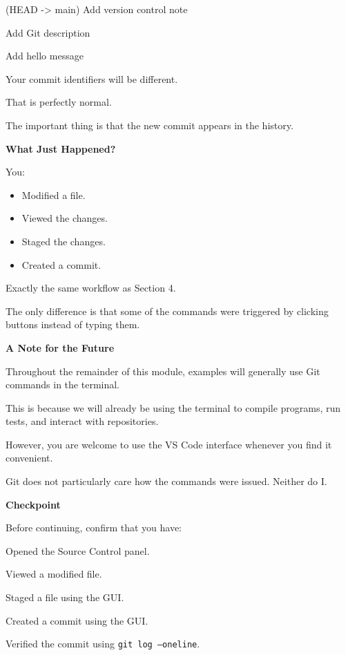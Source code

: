 \documentclass{csc2059practical}
\begin{document}
\begin{terminalplain}
  (HEAD -> main) Add version control note
  
  Add Git description
  
  Add hello message
\end{terminalplain}
  
Your commit identifiers will be different.

That is perfectly normal.

The important thing is that the new commit appears in the history.
\begin{reflectionbox}
  
  \textbf{What Just Happened?}\par
  \medskip
  You:
  
  \begin{itemize}
    \item Modified a file.
    \item Viewed the changes.
    \item Staged the changes.
    \item Created a commit.
  \end{itemize}
  Exactly the same workflow as Section 4.
  
  The only difference is that some of the commands were triggered by clicking buttons instead of typing them.
\end{reflectionbox}
  
\clearpage
\begin{importantnote}
  \textbf{A Note for the Future}\par
  \medskip
  Throughout the remainder of this module, examples will generally use Git commands in the terminal.
  
  This is because we will already be using the terminal to compile programs, run tests, and interact with repositories.
  
  However, you are welcome to use the VS Code interface whenever you find it convenient.
  
  Git does not particularly care how the commands were issued. Neither do I.
\end{importantnote}

\begin{reflectionbox}
\textbf{Checkpoint}\par
\medskip
Before continuing, confirm that you have:

Opened the Source Control panel.

Viewed a modified file.

Staged a file using the GUI.

Created a commit using the GUI.

Verified the commit using \texttt{git log --oneline}.
\end{reflectionbox}
\end{document}
